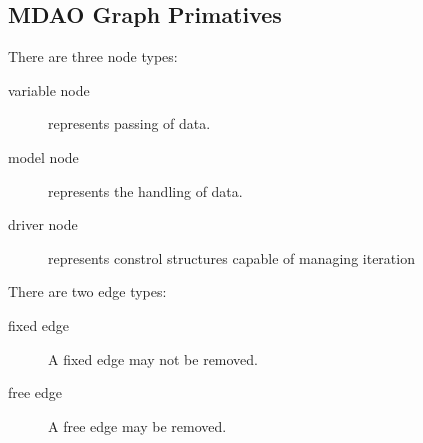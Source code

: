 
\subsection{MDAO Graph Primatives}
There are three node types:  
\begin{description}
\item[variable node] represents passing of data.
\item[model node] represents the handling of data.
\item[driver node] represents constrol structures capable of managing iteration
\end{description}
There are two edge types: 
\begin{description}
\item[fixed edge] A fixed edge may not be removed.
\item[free edge] A free edge may be removed.
\end{description}

